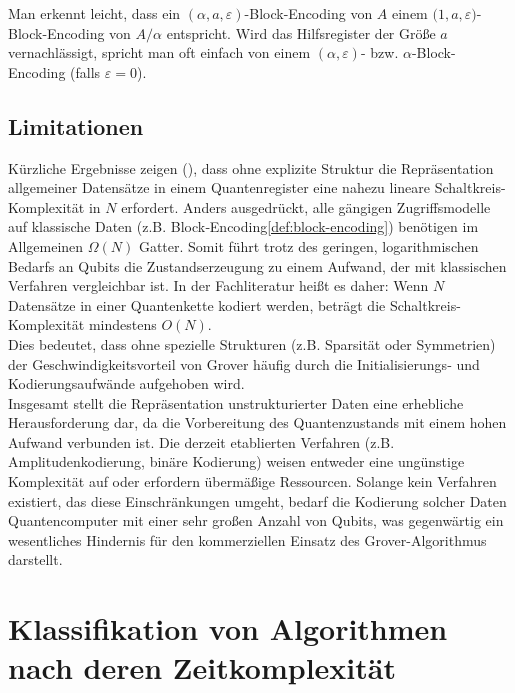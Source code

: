 \begin{enumerate}
    Man erkennt leicht, dass ein \((\alpha,a,\varepsilon)\)-Block-Encoding von \(A\) einem  
    \(\bigl(1,a,\varepsilon\bigr)\)-Block-Encoding von \(A/\alpha\) entspricht. Wird das Hilfsregister der Größe \(a\) vernachlässigt, spricht man oft einfach von einem \((\alpha,\varepsilon)\)- bzw. \(\alpha\)-Block-Encoding (falls \(\varepsilon=0\)).  
\end{enumerate}  

\subsection{Limitationen}
Kürzliche Ergebnisse zeigen (\cite{zhang_xiao-ming_circuit_2024}), dass ohne explizite Struktur die Repräsentation allgemeiner Datensätze in einem Quantenregister eine nahezu lineare Schaltkreis-Komplexität in \(N\) erfordert. Anders ausgedrückt, alle gängigen Zugriffsmodelle auf klassische Daten (z.B. Block‑Encoding\ref{def:block-encoding}) benötigen im Allgemeinen \(\Omega(N)\) Gatter. Somit führt trotz des geringen, logarithmischen Bedarfs an Qubits die Zustandserzeugung zu einem Aufwand, der mit klassischen Verfahren vergleichbar ist. In der Fachliteratur heißt es daher: 
Wenn \(N\) Datensätze in einer Quantenkette kodiert werden, beträgt die Schaltkreis-Komplexität mindestens \(O(N)\).\\

Dies bedeutet, dass ohne spezielle Strukturen (z.B. Sparsität oder Symmetrien) der Geschwindigkeitsvorteil von Grover häufig durch die Initialisierungs‑ und Kodierungsaufwände aufgehoben wird.\\

Insgesamt stellt die Repräsentation unstrukturierter Daten eine erhebliche Herausforderung dar, da die Vorbereitung des Quantenzustands mit einem hohen Aufwand verbunden ist. Die derzeit etablierten Verfahren (z.B. Amplitudenkodierung, binäre Kodierung) weisen entweder eine ungünstige Komplexität auf oder erfordern übermäßige Ressourcen. Solange kein Verfahren existiert, das diese Einschränkungen umgeht, bedarf die Kodierung solcher Daten Quantencomputer mit einer sehr großen Anzahl von Qubits, was gegenwärtig ein wesentliches Hindernis für den kommerziellen Einsatz des Grover-Algorithmus darstellt.

\section{Klassifikation von Algorithmen nach deren Zeitkomplexität}

